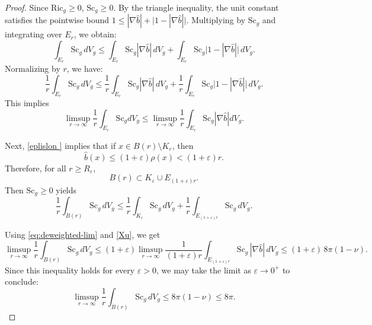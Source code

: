 \documentclass[12pt,oneside,a4paper]{article}
\theoremstyle{mytheorem}
\theoremstyle{remark}
\begin{document}
\begin{proof}
Since $\mathrm{Ric}_g \ge 0$,  $\mathrm{Sc}_g\geq 0$. By the triangle inequality, the unit constant satisfies the pointwise bound $1 \le |\nabla \widehat{b}| + \bigl| 1 - |\nabla \widehat{b}| \bigr|$. Multiplying by $\mathrm{Sc}_g$ and integrating over  $E_r$, we obtain:$$\int_{E_r} \mathrm{Sc}_g \, dV_g \le \int_{E_r} \mathrm{Sc}_g |\nabla \widehat{b}| \, dV_g + \int_{E_r} \mathrm{Sc}_g \bigl| 1 - |\nabla \widehat{b}| \bigr| \, dV_g.$$Normalizing by $r$, we have:$$\frac{1}{r} \int_{E_r} \mathrm{Sc}_g \, dV_g \le \frac{1}{r} \int_{E_r} \mathrm{Sc}_g |\nabla \widehat{b}| \, dV_g + \frac{1}{r} \int_{E_r} \mathrm{Sc}_g \bigl| 1 - |\nabla \widehat{b}| \bigr| \, dV_g.$$
This implies 
\begin{equation}\label{eq:deweighted-lim}\limsup_{r \to \infty} \frac{1}{r} \int_{E_r} \mathrm{Sc}_g  dV_g \le \limsup_{r \to \infty} \frac{1}{r} \int_{E_r} \mathrm{Sc}_g |\nabla \widehat{b}| dV_g.\end{equation}

Next, \eqref{eplislon } implies that if $x\in B(r)\setminus K_\varepsilon$,
then
\[
\widehat b(x)\le (1+\varepsilon)\rho(x)<(1+\varepsilon)r.
\]
Therefore, for all $r\ge R_\varepsilon$,
\[
B(r)\subset K_\varepsilon\cup E_{(1+\varepsilon)r}.
\]
Then $\mathrm{Sc}_g\ge 0$ yields
\[
\frac{1}{r}\int_{B(r)}\mathrm{Sc}_g\,dV_g
\le
\frac{1}{r}\int_{K_\varepsilon}\mathrm{Sc}_g\,dV_g
+\frac{1}{r}\int_{E_{(1+\varepsilon)r}}\mathrm{Sc}_g\,dV_g.
\]

Using \eqref{eq:deweighted-lim} and \eqref{Xu}, we get
\[
\limsup_{r\to\infty}\frac1r\int_{B(r)}\mathrm{Sc}_g\,dV_g
\le
(1+\varepsilon)
\limsup_{r\to\infty}\frac{1}{(1+\varepsilon)r}\int_{E_{(1+\varepsilon)r}}\mathrm{Sc}_g\,|\nabla \widehat b|\,dV_g
\le
(1+\varepsilon)\,8\pi(1-\nu).
\]
Since this inequality holds for every $\varepsilon > 0$, we may take the limit as $\varepsilon \to 0^+$ to conclude:
\[
\limsup_{r\to\infty}\frac1r\int_{B(r)}\mathrm{Sc}_g\,dV_g
\le
8\pi(1-\nu)\le 8\pi.
\]
\end{proof}
\end{document}
